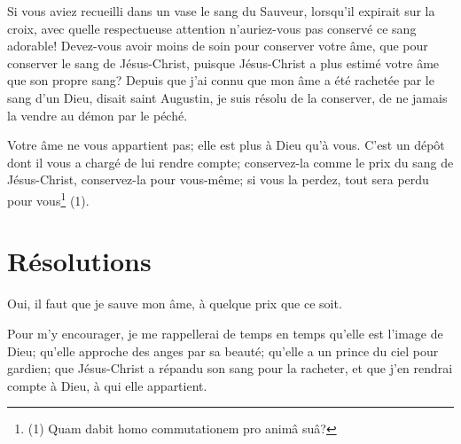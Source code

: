 \documentclass[instructions.tex]{subfiles}
\begin{document}
Si vous aviez recueilli dans un vase le sang du Sauveur, lorsqu’il expirait sur la croix, avec quelle respectueuse attention n’auriez-vous pas conservé ce sang adorable! Devez-vous avoir moins de soin pour conserver votre âme, que pour conserver le sang de Jésus-Christ, puisque Jésus-Christ a plus estimé votre âme que son propre sang? Depuis que j’ai connu que mon âme a été rachetée par le sang d’un Dieu, disait saint Augustin, je suis résolu de la conserver, de ne jamais la vendre au démon par le péché.
 
Votre âme ne vous appartient pas; elle est plus à Dieu qu’à vous. C’est un dépôt dont il vous a chargé de lui rendre compte; conservez-la comme le prix du sang de Jésus-Christ, conservez-la pour vous-même; si vous la perdez, tout sera perdu pour vous\footnote{(1) Quam dabit homo commutationem pro animâ suâ?} (1).
 
\section{Résolutions}
 
\primo Oui, il faut que je sauve mon âme, à quelque prix que ce soit.

\secundo Pour m’y encourager, je me rappellerai de temps en temps qu’elle est l’image de Dieu; qu’elle approche des anges par sa beauté; qu’elle a un prince du ciel pour gardien; que Jésus-Christ a répandu son sang pour la racheter, et que j’en rendrai compte à Dieu, à qui elle appartient. 

 
\end{document}
